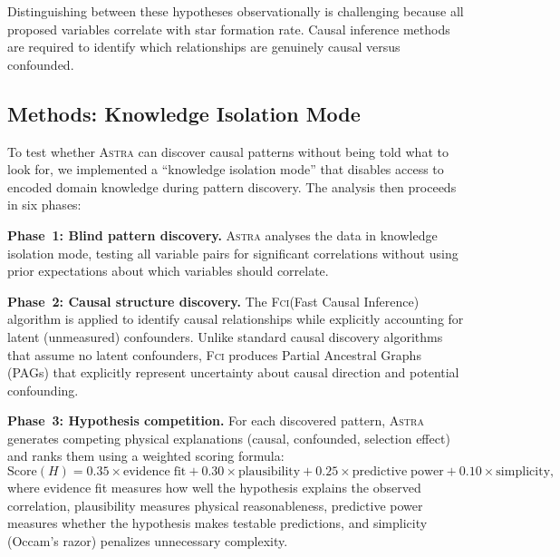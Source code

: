 \documentclass[fleqn,usenatbib]{mnras}
\newcommand{\astra}{\textsc{Astra}\xspace}
\newcommand{\fci}{\textsc{Fci}\xspace}
\begin{document}
Distinguishing between these hypotheses observationally is challenging because all proposed variables correlate with star formation rate.
Causal inference methods are required to identify which relationships are genuinely causal versus confounded.

\subsection{Methods: Knowledge Isolation Mode}
\label{sec:tc6:methods}

To test whether \astra can discover causal patterns without being told what to look for, we implemented a ``knowledge isolation mode'' that disables access to encoded domain knowledge during pattern discovery.
The analysis then proceeds in six phases:

\textbf{Phase~1: Blind pattern discovery.}
\astra analyses the data in knowledge isolation mode, testing all variable pairs for significant correlations without using prior expectations about which variables should correlate.

\textbf{Phase~2: Causal structure discovery.}
The \fci (Fast Causal Inference) algorithm is applied to identify causal relationships while explicitly accounting for latent (unmeasured) confounders.
Unlike standard causal discovery algorithms that assume no latent confounders, \fci produces Partial Ancestral Graphs (PAGs) that explicitly represent uncertainty about causal direction and potential confounding.

\textbf{Phase~3: Hypothesis competition.}
For each discovered pattern, \astra generates competing physical explanations (causal, confounded, selection effect) and ranks them using a weighted scoring formula:
\begin{equation}
  \mathrm{Score}(H) = 0.35 \times \mathrm{evidence\;fit} + 0.30 \times \mathrm{plausibility} + 0.25 \times \mathrm{predictive\;power} + 0.10 \times \mathrm{simplicity},
  \label{eq:hypothesis_score}
\end{equation}
where evidence fit measures how well the hypothesis explains the observed correlation, plausibility measures physical reasonableness, predictive power measures whether the hypothesis makes testable predictions, and simplicity (Occam's razor) penalizes unnecessary complexity.
\end{document}
